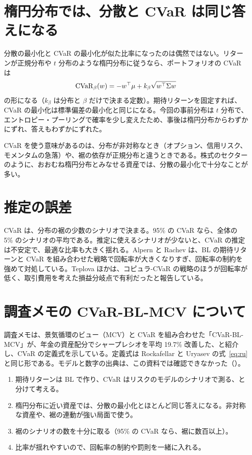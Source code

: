 \section{楕円分布では、分散と CVaR は同じ答えになる}

分散の最小化と CVaR の最小化が似た比率になったのは偶然ではない。リターンが正規分布や $t$ 分布のような楕円分布に従うなら、ポートフォリオの CVaR は
\begin{equation}
\mathrm{CVaR}_\beta(w)=-w^{\top}\mu+k_\beta\sqrt{w^{\top}\Sigma w}
\end{equation}
の形になる（$k_\beta$ は分布と $\beta$ だけで決まる定数）。期待リターンを固定すれば、CVaR の最小化は標準偏差の最小化と同じになる。今回の事前分布は $t$ 分布で、エントロピー・プーリングで確率を少し変えたため、事後は楕円分布からわずかにずれ、答えもわずかにずれた。

CVaR を使う意味があるのは、分布が非対称なとき（オプション、信用リスク、モメンタムの急落）や、裾の依存が正規分布と違うときである。株式のセクターのように、おおむね楕円分布とみなせる資産では、分散の最小化で十分なことが多い。

\section{推定の誤差}

CVaR は、分布の裾の少数のシナリオで決まる。95\% の CVaR なら、全体の 5\% のシナリオの平均である。推定に使えるシナリオが少ないと、CVaR の推定は不安定で、最適な比率も大きく揺れる。Alpern と Rachev は、BL の期待リターンと CVaR を組み合わせた戦略で回転率が大きくなりすぎ、回転率の制約を強めて対処している。Teplova ほかは、コピュラ-CVaR の戦略のほうが回転率が低く、取引費用を考えた損益分岐点で有利だったと報告している。

\section{調査メモの CVaR-BL-MCV について}

調査メモは、景気循環のビュー（MCV）と CVaR を組み合わせた「CVaR-BL-MCV」が、年金の資産配分でシャープレシオを平均 19.7\% 改善した、と紹介し、CVaR の定義式を示している。定義式は Rockafellar と Uryasev の式~\eqref{eq:ru} と同じ形である。モデルと数字の出典は、この資料では確認できなかった（）。

\begin{tipbox}
\begin{enumerate}
\item 期待リターンは BL で作り、CVaR はリスクのモデルのシナリオで測る、と分けて考える。
\item 楕円分布に近い資産では、分散の最小化とほとんど同じ答えになる。非対称な資産や、裾の連動が強い局面で使う。
\item 裾のシナリオの数を十分に取る（95\% の CVaR なら、裾に数百以上）。
\item 比率が揺れやすいので、回転率の制約や罰則を一緒に入れる。
\end{enumerate}
\end{tipbox}

